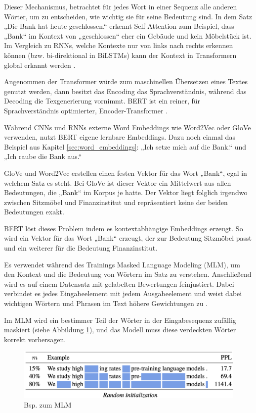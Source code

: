 Dieser Mechanismus, betrachtet für jedes Wort in einer Sequenz alle anderen Wörter, um zu entscheiden, 
wie wichtig sie für seine Bedeutung sind.
In dem Satz „Die Bank hat heute geschlossen.“ erkennt Self-Attention zum Beispiel, dass „Bank“ im Kontext von „geschlossen“ eher ein Gebäude 
und kein Möbelstück ist. %
Im Vergleich zu RNNs, welche Kontexte nur von links nach rechts erkennen können (bzw. bi-direktional in BiLSTMs) kann der Kontext in Transformern
global erkannt werden \cite{ghojogh2020}.

Angenommen der Transformer würde zum maschinellen Übersetzen eines Textes genutzt werden, dann besitzt das Encoding das Sprachverständnis, 
während das Decoding die Texgenerierung vornimmt. BERT ist ein reiner, für Sprachverständnis optimierter, Encoder-Transformer \cite{devlin2019}.

Während CNNs und RNNs externe Word Embeddings wie Word2Vec oder GloVe verwenden, nutzt BERT eigene lernbare Embeddings.
Dazu noch einmal das Beispiel aus Kapitel \ref{sec:word_embeddings}: „Ich setze mich auf die Bank.“ und „Ich raube die Bank aus.“

GloVe und Word2Vec erstellen einen festen Vektor für das Wort „Bank“, egal in welchem Satz es steht.
Bei GloVe ist dieser Vektor ein Mittelwert aus allen Bedeutungen, die „Bank“ im Korpus je hatte.
Der Vektor liegt folglich irgendwo zwischen Sitzmöbel und Finanzinstitut und repräsentiert keine der beiden Bedeutungen exakt.

BERT löst dieses Problem indem es kontextabhängige Embeddings erzeugt. So wird ein Vektor für das Wort „Bank“ erzeugt, der zur Bedeutung
Sitzmöbel passt und ein weiterer für die Bedeutung Finanzinstitut.

Es verwendet während des Trainings Masked Language Modeling (MLM), um den Kontext und die Bedeutung von Wörtern im Satz zu verstehen.
Anschließend wird es auf einem Datensatz mit gelabelten Bewertungen feinjustiert. 
Dabei verbindet es jedes Eingabeelement mit jedem Ausgabeelement und 
weist dabei wichtigen Wörtern und Phrasen im Text höhere Gewichtungen zu \cite{Deshai:2023aa}.

Im MLM wird ein bestimmer Teil der Wörter in der Eingabesequenz zufällig maskiert (siehe Abbildung \ref{fig:mlm_bert}), 
und das Modell muss diese verdeckten Wörter korrekt vorhersagen.

\begin{figure}[htbp]
    \begin{center}
        \includegraphics[scale=0.5]{static/mlm_bert.png}
        \caption{\label{fig:mlm_bert} Bsp. zum MLM \cite{wettig2023}}
    \end{center}
\end{figure}

